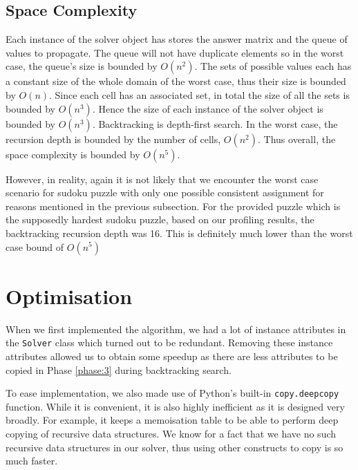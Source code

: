 \documentclass[11pt, a4paper]{article}
\begin{document}
\subsection{Space Complexity}
Each instance of the solver object has stores the answer matrix and the queue of values to propagate.
The queue will not have duplicate elements so in the worst case, the queue's size is bounded by $O(n^2)$.
The sets of possible values each has a constant size of the whole domain of the worst case, thus their size is bounded by $O(n)$.
Since each cell has an associated set, in total the size of all the sets is bounded by $O(n^3)$.
Hence the size of each instance of the solver object is bounded by $O(n^3)$.
Backtracking is depth-first search.
In the worst case, the recursion depth is bounded by the number of cells, $O(n^2)$.
Thus overall, the space complexity is bounded by $O(n^5)$.

However, in reality, again it is not likely that we encounter the worst case scenario for sudoku puzzle with only one possible consistent assignment for reasons mentioned in the previous subsection.
For the provided puzzle which is the supposedly hardest sudoku puzzle, based on our profiling results, the backtracking recursion depth was 16.
This is definitely much lower than the worst case bound of $O(n^5)$


\section{Optimisation}
When we first implemented the algorithm, we had a lot of instance attributes in the \texttt{Solver} class which turned out to be redundant.
Removing these instance attributes allowed us to obtain some speedup as there are less attributes to be copied in Phase \ref{phase:3} during backtracking search.

To ease implementation, we also made use of Python's built-in \texttt{copy.deepcopy} function.
While it is convenient, it is also highly inefficient as it is designed very broadly.
For example, it keeps a memoisation table to be able to perform deep copying of recursive data structures.
We know for a fact that we have no such recursive data structures in our solver, thus using other constructs to copy is so much faster.
\end{document}

